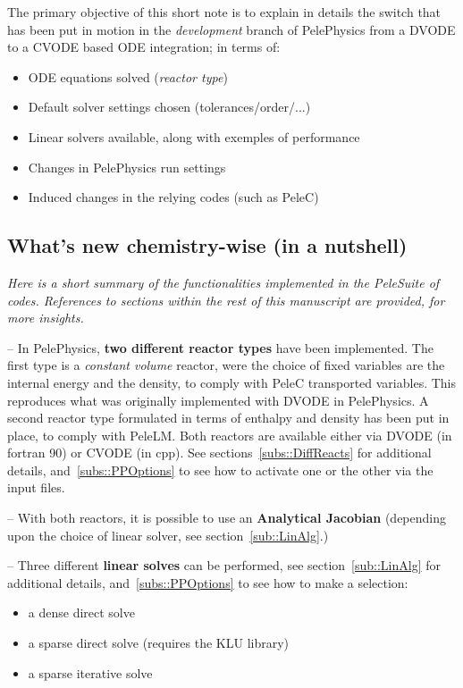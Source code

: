 \documentclass[12pt]{article}
\begin{document}
The primary objective of this short note is to explain in details the switch that has been put in motion in the \textit{development} branch of PelePhysics from a DVODE to a CVODE based ODE integration; in terms of:
\begin{itemize}
\item ODE equations solved (\textit{reactor type})
\item Default solver settings chosen (tolerances/order/...)
\item Linear solvers available, along with exemples of performance
\item Changes in PelePhysics run settings
\item Induced changes in the relying codes (such as PeleC)
\end{itemize} 

\subsection{What's new chemistry-wise (in a nutshell)}
\label{subs::WD}

\textit{Here is a short summary of the functionalities implemented in the PeleSuite of codes. References to sections within the rest of this manuscript are provided, for more insights.}

-- In PelePhysics, \textbf{two different reactor types} have been implemented. The first type is a \textit{constant volume} reactor, were the choice of fixed variables are the internal energy and the density, to comply with PeleC transported variables. This reproduces what was originally implemented with DVODE in PelePhysics. A second reactor type formulated in terms of enthalpy and density has been put in place, to comply with PeleLM. Both reactors are available either via DVODE (in fortran 90) or CVODE (in cpp). See sections~\ref{subs::DiffReacts} for additional details, and~\ref{subs::PPOptions} to see how to activate one or the other via the input files.

-- With both reactors, it is possible to use an \textbf{Analytical Jacobian} (depending upon the choice of linear solver, see section~\ref{sub::LinAlg}.)

-- Three different \textbf{linear solves} can be performed, see section~\ref{sub::LinAlg} for additional details, and~\ref{subs::PPOptions} to see how to make a selection:
\begin{itemize}
\item a dense direct solve
\item a sparse direct solve (requires the KLU library)
\item a sparse iterative solve
\end{itemize} 
\end{document}
